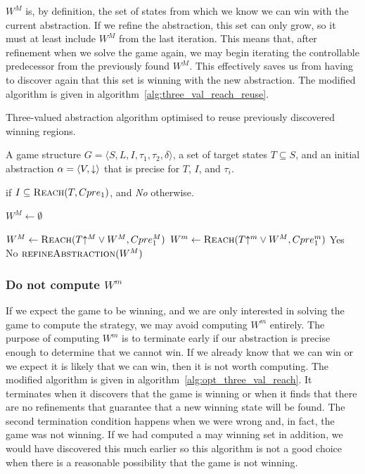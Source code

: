 $W^M$ is, by definition, the set of states from which we know we can win with the current abstraction. If we refine the abstraction, this set can only grow, so it must at least include $W^M$ from the last iteration. This means that, after refinement when we solve the game again, we may begin iterating the controllable predecessor from the previously found $W^M$. This effectively saves us from having to discover again that this set is winning with the new abstraction. The modified algorithm is given in algorithm~\ref{alg:three_val_reach_reuse}.

\begin{algorithm}
\caption{Three-valued abstraction algorithm optimised to reuse previously discovered winning regions.}
\label{alg:three_val_reach_reuse}

\begin{algorithmic}[1]

\Require A game structure $G = \langle S, L, I, \tau_1, \tau_2, \delta \rangle$, a set 
of target states $T\subseteq S$, and an initial abstraction $\alpha=\langle V, \mathord{\downarrow} \rangle$
that is precise for $T$, $I$, and $\tau_i$.

 if $I \subseteq \textsc{Reach}(T, Cpre_1)$, and {\it No} otherwise.


    \State $W^M \gets \emptyset$

    \Loop
        \State $W^M \gets \textsc{Reach}(T\mathord{\uparrow^M} \vee W^M, Cpre_1^M)$
        \State $W^m \gets \textsc{Reach}(T\mathord{\uparrow^m} \vee W^M, Cpre_1^m)$
            \State\Return Yes
            \State\Return No
        \Else       
            \State$\Call{refineAbstraction}{W^M}$
        \EndIf
    \EndLoop
\EndFunction

\end{algorithmic}
\end{algorithm}

\subsubsection{Do not compute $W^m$}

If we expect the game to be winning, and we are only interested in solving the game to compute the strategy, we may avoid computing $W^m$ entirely. The purpose of computing $W^m$ is to terminate early if our abstraction is precise enough to determine that we cannot win. If we already know that we can win or we expect it is likely that we can win, then it is not worth computing. The modified algorithm is given in algorithm~\ref{alg:opt_three_val_reach}. It terminates when it discovers that the game is winning or when it finds that there are no refinements that guarantee that a new winning state will be found. The second termination condition happens when we were wrong and, in fact, the game was not winning. If we had computed a may winning set in addition, we would have discovered this much earlier so this algorithm is not a good choice when there is a reasonable possibility that the game is not winning.

